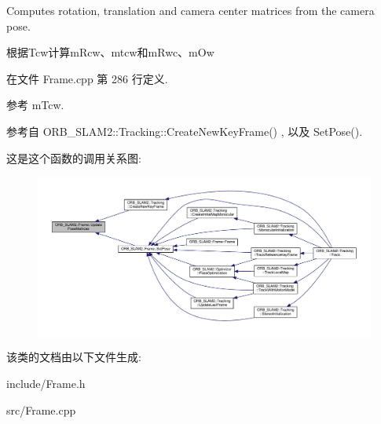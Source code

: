 Computes rotation, translation and camera center matrices from the camera pose. 

根据\-Tcw计算m\-Rcw、mtcw和m\-Rwc、m\-Ow 

在文件 Frame.\-cpp 第 286 行定义.



参考 m\-Tcw.



参考自 O\-R\-B\-\_\-\-S\-L\-A\-M2\-::\-Tracking\-::\-Create\-New\-Key\-Frame() , 以及 Set\-Pose().



这是这个函数的调用关系图\-:
\nopagebreak
\begin{figure}[H]
\begin{center}
\leavevmode
\includegraphics[width=350pt]{classORB__SLAM2_1_1Frame_a0a18d3024a23f6fa2cab9c7d987598c2_icgraph}
\end{center}
\end{figure}




该类的文档由以下文件生成\-:\begin{DoxyCompactItemize}
\item 
include/Frame.\-h\item 
src/Frame.\-cpp\end{DoxyCompactItemize}
